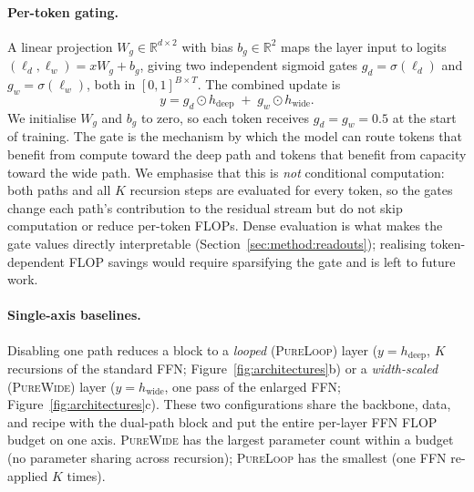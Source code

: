 \documentclass[11pt]{article}
\newcommand{\rev}[1]{{\color{red}#1}}
\begin{document}
\paragraph{Per-token gating.}
A linear projection $W_g \in \mathbb{R}^{d \times 2}$ with bias
$b_g \in \mathbb{R}^{2}$ maps the layer input to logits
$(\ell_d, \ell_w) = x W_g + b_g$, giving two independent sigmoid
gates $g_d = \sigma(\ell_d)$ and $g_w = \sigma(\ell_w)$, both in
$[0,1]^{B \times T}$. The combined update is
\begin{equation}
\label{eq:two-gates}
y = g_d \odot h_{\text{deep}} \;+\; g_w \odot h_{\text{wide}}.
\end{equation}
We initialise $W_g$ and $b_g$ to zero, so each token receives
$g_d = g_w = 0.5$ at the start of training. The gate is the mechanism by which the model can route tokens that benefit from compute toward the deep path and tokens that benefit from capacity toward the wide path. \rev{We emphasise that this is \emph{not} conditional computation: both paths and all $K$ recursion steps are evaluated for every token, so the gates change each path's contribution to the residual stream but do not skip computation or reduce per-token FLOPs. Dense evaluation is what makes the gate values directly interpretable (Section~\ref{sec:method:readouts}); realising token-dependent FLOP savings would require sparsifying the gate and is left to future work.}

\paragraph{Single-axis baselines.}
Disabling one path reduces a block to a \emph{looped} (\textsc{PureLoop}) layer ($y = h_{\text{deep}}$, $K$ recursions of the standard FFN; Figure~\ref{fig:architectures}b) or a \emph{width-scaled} (\textsc{PureWide}) layer ($y = h_{\text{wide}}$, one pass of the enlarged FFN; Figure~\ref{fig:architectures}c). These two configurations share the backbone, data, and recipe with the dual-path block and put the entire per-layer FFN FLOP budget on one axis. \textsc{PureWide} has the largest parameter count within a budget (no parameter sharing across recursion); \textsc{PureLoop} has the smallest (one FFN re-applied $K$ times). 
\end{document}
